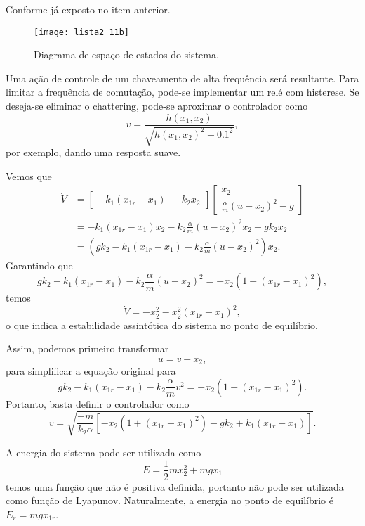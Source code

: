 \documentclass[a4paper]{report}
\begin{document}

Conforme já exposto no item anterior.

\begin{figure}[H]
    \centering
    \texttt{[image: lista2\_11b]}
    \caption{Diagrama de espaço de estados do sistema.}
    \label{fig:lista2_11b}
\end{figure}


Uma ação de controle de um chaveamento de alta frequência será resultante. Para limitar a frequência de comutação, pode-se implementar um relé com histerese. Se deseja-se eliminar o chattering, pode-se aproximar o controlador como \[
v = \frac{h\left( x_1,x_2 \right) }{\sqrt{h\left( x_1,x_2 \right)^2 + 0.1^2} }
,\] por exemplo, dando uma resposta suave.


Vemos que
\begin{align*}
    \dot{V} &= \begin{bmatrix} -k_1\left( x_{1r}-x_1 \right)  & -k_2x_2\end{bmatrix} \begin{bmatrix} x_2 \\ \frac{\alpha}{m}\left( u-x_2 \right) ^2 -g \end{bmatrix} \\
    &= -k_1\left( x_{1r}-x_1 \right) x_2 -k_2 \frac{\alpha}{m}\left( u-x_2 \right)^2x_2 +gk_2x_2 \\
    &= \left( gk_2 -k_1\left( x_{1r}-x_1 \right) -k_2 \frac{\alpha}{m}\left( u-x_2 \right)^2 \right) x_2
.\end{align*}
Garantindo que \[
gk_2 -k_1\left( x_{1r}-x_1 \right) -k_2 \frac{\alpha}{m}\left( u-x_2 \right)^2 = -x_2\left(1 + \left( x_{1r} - x_1 \right)^2   \right) 
,\] temos \[
\dot{V} = -x_2^2 -x_2^2\left( x_{1r}-x_1 \right)^2
,\] o que indica a estabilidade assintótica do sistema no ponto de equilíbrio.

Assim, podemos primeiro transformar \[
u = v + x_2
,\] para simplificar a equação original para \[
gk_2 -k_1\left( x_{1r}-x_1 \right) -k_2 \frac{\alpha}{m}v^2 = -x_2\left(1 + \left( x_{1r} - x_1 \right)^2   \right)
.\] Portanto, basta definir o controlador como \[
v = \sqrt{ \frac{-m}{k_2\alpha}\left[  -x_2\left(1 + \left( x_{1r} - x_1 \right)^2   \right) - gk_2 +k_1\left( x_{1r}-x_1 \right)\right] }
.\] 


A energia do sistema pode ser utilizada como \[
    E = \frac{1}{2}m x_2^2 + mgx_1
\] temos uma função que não é positiva definida, portanto não pode ser utilizada como função de Lyapunov. Naturalmente, a energia no ponto de equilíbrio é $E_r = mgx_{1r}$.
\end{document}

